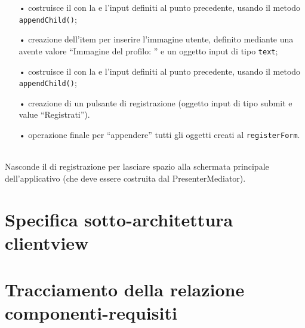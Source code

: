\begin{description}
\begin{itemize}
		\item[•] costruisce il  con la  e l'input definiti al punto precedente, usando il metodo \texttt{appendChild()};
		\item[•] creazione dell'item per inserire l'immagine utente, definito mediante una  avente valore ``Immagine del profilo: '' e un oggetto input di tipo \texttt{text};
		\item[•] costruisce il  con la  e l'input definiti al punto precedente, usando il metodo \texttt{appendChild()};
		\item[•] creazione di un pulsante di registrazione (oggetto input di tipo submit e value ``Registrati'').
		\item[•] operazione finale per ``appendere'' tutti  gli oggetti creati al \texttt{registerForm}.
	\end{itemize}
	
	\item{}\\
	Nasconde il  di registrazione per lasciare spazio alla schermata principale dell'applicativo (che deve essere costruita dal PresenterMediator).

\end{description}

\clearpage

\section{Specifica sotto-architettura clientview}\label{sec:clientviewarchitecture}

\clearpage

\section{Tracciamento della relazione componenti-requisiti}


